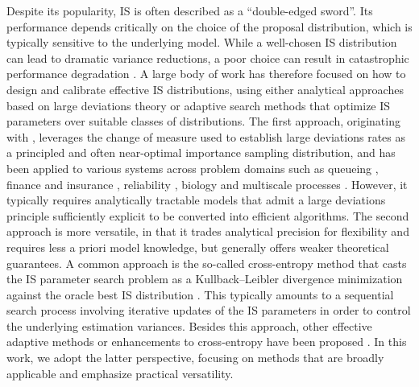 \documentclass[11pt,a4paper]{article}
\theoremstyle{definition}
\begin{document}
Despite its popularity, IS is often described as a “double-edged sword”. Its performance depends critically on the choice of the proposal distribution, which is typically sensitive to the underlying model. While a well-chosen IS distribution can lead to dramatic variance reductions, a poor choice can result in catastrophic performance degradation \cite{glynn1989importance, sadowsky2002large,l2010asymptotic,owen2000safe, hesterberg1995weighted}. A large body of work has therefore focused on how to design and calibrate effective IS distributions, using either analytical approaches based on large deviations theory or adaptive search methods that optimize IS parameters over suitable classes of distributions. The first approach, originating with \cite{siegmund1976importance}, leverages the change of measure used to establish large deviations rates \cite{dembo2016lecture} as a principled and often near-optimal importance sampling distribution, and has been applied to various systems across problem domains such as queueing \cite{dupuis2009importance,blanchet2014rare,kroese1999efficient,ridder2009importance}, finance and insurance \cite{glasserman2008fast,glasserman2005importance,asmussen1985conjugate,collamore2002importance,chen2019efficient}, reliability \cite{rubino2009markovian,heidelberger1995fast,nicola2002fast}, biology and multiscale processes \cite{sandmann2009rare,dupuis2012importance,vanden2012rare}. However, it typically requires analytically tractable models that admit a large deviations principle sufficiently explicit to be converted into efficient algorithms. The second approach is more versatile, in that it trades analytical precision for flexibility and requires less a priori model knowledge, but generally offers weaker theoretical guarantees. A common approach is the so-called cross-entropy method that casts the IS parameter search problem as a Kullback–Leibler divergence minimization against the oracle best IS distribution \cite{de2005tutorial,rubinstein2004cross}. This typically amounts to a sequential search process involving iterative updates of the IS parameters in order to control the underlying estimation variances. Besides this approach, other effective adaptive methods or enhancements to cross-entropy have been proposed \cite{egloff2010quantile, bugallo2017adaptive,botev2013markov,chan2012improved,grace2014automated,parpas2015importance}. In this work, we adopt the latter perspective, focusing on methods that are broadly applicable and emphasize practical versatility.
\end{document}
